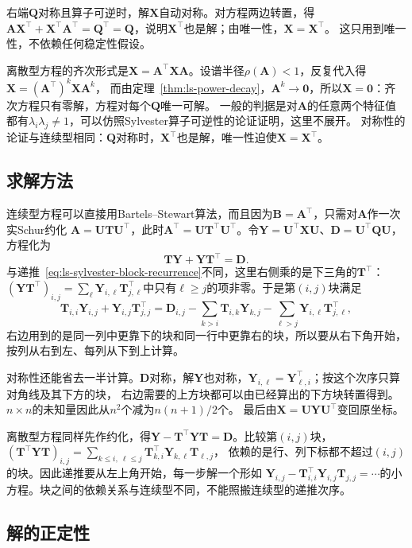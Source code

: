 右端$\bm Q$对称且算子可逆时，解$\bm X$自动对称。对方程两边转置，得
$\bm A\bm X^\top+\bm X^\top\bm A^\top=\bm Q^\top=\bm Q$，说明$\bm X^\top$也是解；由唯一性，$\bm X=\bm X^\top$。
这只用到唯一性，不依赖任何稳定性假设。

离散型方程的齐次形式是$\bm X=\bm A^\top\bm X\bm A$。设谱半径$\rho(\bm A)<1$，反复代入得$\bm X=(\bm A^\top)^k\bm X\bm A^k$，
而由定理~\ref{thm:ls-power-decay}，$\bm A^k\to\bm0$，所以$\bm X=\bm0$：齐次方程只有零解，方程对每个$\bm Q$唯一可解。
一般的判据是对$\bm A$的任意两个特征值都有$\lambda_i\lambda_j\neq1$，可以仿照Sylvester算子可逆性的论证证明，这里不展开。
对称性的论证与连续型相同：$\bm Q$对称时，$\bm X^\top$也是解，唯一性迫使$\bm X=\bm X^\top$。

\subsection{求解方法}
\label{sec:ls-lyapunov-solve}

连续型方程可以直接用Bartels--Stewart算法，而且因为$\bm B=\bm A^\top$，只需对$\bm A$作一次实Schur约化
$\bm A=\bm U\bm T\bm U^\top$，此时$\bm A^\top=\bm U\bm T^\top\bm U^\top$。令$\bm Y=\bm U^\top\bm X\bm U$、$\bm D=\bm U^\top\bm Q\bm U$，方程化为
\[
 \bm T\bm Y+\bm Y\bm T^\top=\bm D .
\]
与递推~\eqref{eq:ls-sylvester-block-recurrence}不同，这里右侧乘的是下三角的$\bm T^\top$：
$(\bm Y\bm T^\top)_{i,j}=\sum_\ell\bm Y_{i,\ell}\bm T_{j,\ell}^\top$中只有$\ell\geq j$的项非零。于是第$(i,j)$块满足
\[
 \bm T_{i,i}\bm Y_{i,j}+\bm Y_{i,j}\bm T_{j,j}^\top
 =\bm D_{i,j}-\sum_{k>i}\bm T_{i,k}\bm Y_{k,j}-\sum_{\ell>j}\bm Y_{i,\ell}\bm T_{j,\ell}^\top ,
\]
右边用到的是同一列中更靠下的块和同一行中更靠右的块，所以要从右下角开始，按列从右到左、每列从下到上计算。

对称性还能省去一半计算。$\bm D$对称，解$\bm Y$也对称，$\bm Y_{i,\ell}=\bm Y_{\ell,i}^\top$；按这个次序只算对角线及其下方的块，
右边需要的上方块都可以由已经算出的下方块转置得到。$n\times n$的未知量因此从$n^2$个减为$n(n+1)/2$个。
最后由$\bm X=\bm U\bm Y\bm U^\top$变回原坐标。

离散型方程同样先作约化，得$\bm Y-\bm T^\top\bm Y\bm T=\bm D$。比较第$(i,j)$块，
$(\bm T^\top\bm Y\bm T)_{i,j}=\sum_{k\leq i,\ \ell\leq j}\bm T_{k,i}^\top\bm Y_{k,\ell}\bm T_{\ell,j}$，
依赖的是行、列下标都不超过$(i,j)$的块。因此递推要从左上角开始，每一步解一个形如
$\bm Y_{i,j}-\bm T_{i,i}^\top\bm Y_{i,j}\bm T_{j,j}=\cdots$的小方程。块之间的依赖关系与连续型不同，不能照搬连续型的递推次序。

\subsection{解的正定性}
\label{sec:ls-lyapunov-positivity}


